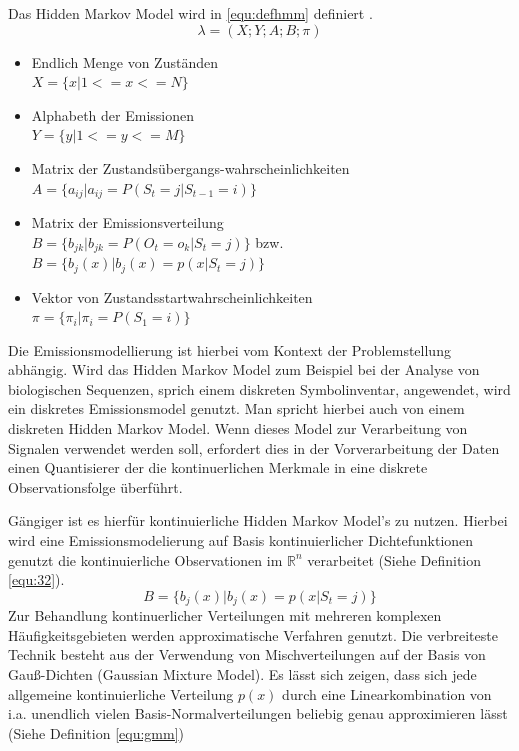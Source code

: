 Das Hidden Markov Model wird in \ref{equ:defhmm} definiert \cite[68]{mmmFink}. 
\begin{equation}
\label{equ:defhmm}
\lambda = (X;Y;A;B;\pi)
\end{equation}
\begin{itemize}
     \item Endlich Menge von Zuständen \\
           \( X = \{ x | 1 <= x <= N \} \)
     \item Alphabeth der Emissionen \\
           \( Y = \{ y | 1 <= y <= M \} \)
     \item Matrix der Zustandsübergangs-wahrscheinlichkeiten \\
           \( A = \{ a_{ij} | a_{ij} = P(S_t = j | S_{t-1} = i) \} \)
     \item Matrix der Emissionsverteilung \\
           \( B = \{ b_{jk} | b_{jk} = P(O_t = o_k | S_t = j) \} \) bzw. \\
           \( B = \{ b_{j}(x) | b_{j}(x) = p(x|S_t = j) \} \)
     \item Vektor von Zustandsstartwahrscheinlichkeiten \\
           \( \pi = \{ \pi_i | \pi_i = P(S_1 = i) \} \) 
\end{itemize}


Die Emissionsmodellierung ist hierbei vom Kontext der Problemstellung abhängig. Wird das Hidden Markov Model zum Beispiel bei der Analyse von biologischen Sequenzen, sprich einem diskreten Symbolinventar, angewendet, wird ein diskretes  Emissionsmodel genutzt. Man spricht hierbei auch von einem diskreten Hidden Markov Model. Wenn dieses Model zur Verarbeitung von Signalen verwendet werden soll, erfordert dies in der Vorverarbeitung der Daten einen Quantisierer der die kontinuerlichen Merkmale in eine diskrete Observationsfolge überführt. 

Gängiger ist es hierfür kontinuierliche Hidden Markov Model's zu nutzen. Hierbei wird eine Emissionsmodelierung auf Basis kontinuierlicher Dichtefunktionen genutzt die kontinuierliche Observationen im \(\mathbb{R}^n\) verarbeitet (Siehe Definition \ref{equ:32}).
\begin{equation}
\label{equ:32}
B =\{ b_{j}(x) | b_{j}(x) = p(x|S_t = j) \}
\end{equation}
Zur Behandlung kontinuerlicher Verteilungen mit mehreren komplexen Häufigkeitsgebieten werden approximatische Verfahren genutzt. Die verbreiteste Technik besteht aus der Verwendung von Mischverteilungen auf der Basis von Gauß-Dichten (Gaussian Mixture Model). Es lässt sich  zeigen, dass sich jede allgemeine kontinuierliche Verteilung \(p(x)\) durch eine Linearkombination von i.a. unendlich vielen Basis-Normalverteilungen beliebig genau approximieren lässt \cite[69]{mmmFink} (Siehe Definition \ref{equ:gmm})
 
